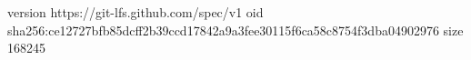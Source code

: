 version https://git-lfs.github.com/spec/v1
oid sha256:ce12727bfb85dcff2b39ccd17842a9a3fee30115f6ca58c8754f3dba04902976
size 168245
